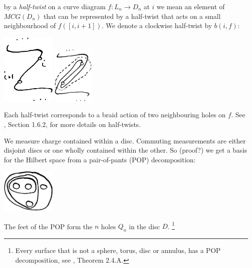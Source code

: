 \documentclass[12pt,a4paper]{article}
\begin{document}


 by a {\it half-twist} on a curve
diagram $f:L_n\to D_n$ at $i$ we mean an element of $MCG(D_n)$
that can be represented by a half-twist that acts
on a small neighbourhood of $f([i, i+1]).$
We denote a clockwise half-twist by $b(i, f):$

\begin{center}
\includegraphics[width=0.2\textwidth]{halftwist-1.eps}
\includegraphics[width=0.15\textwidth]{halftwist-2.eps}
\end{center}

Each half-twist corresponds to a braid action of two neighbouring
holes on $f$.
See \cite{Kassel10}, Section 1.6.2, for more details on half-twists.




We measure charge contained within a disc. %
Commuting measurements are either disjoint discs or
one wholly contained within the other.
So (proof?) we get a basis for the Hilbert space from
a pair-of-pants (POP) decomposition:

\begin{center}
\includegraphics[width=0.2\textwidth]{POP-1.eps}
\end{center}

The feet of the POP form the $n$ holes $Q_n$ in the disc $D$.
\footnote{Every surface that is not a sphere, torus, disc or annulus, has
a POP decomposition, see \cite{Ivanov01}, Theorem 2.4.A.}
\end{document}
